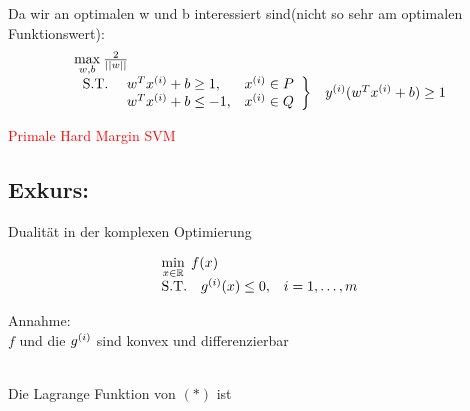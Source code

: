 		Da wir an optimalen w und b interessiert sind(nicht so sehr am optimalen Funktionswert):\\
		
		\begin{equation*}
			\begin{array}{ll}
				\underset{w,b}{\max}\medspace \frac{2}{||w||}\\ \left.
				\begin{array}{lll}
					\text{S.T. } & w^Tx^{(i)} + b \geq  1, & x^{(i)} \in P\\
					& w^Tx^{(i)} + b \leq -1, & x^{(i)} \in Q
				\end{array} \right\} &  y^{(i)}(w^Tx^{(i)} + b) \geq 1
			\end{array}
		\end{equation*}
		
		\begin{center}
			 \textcolor{red}{Primale Hard Margin SVM}
		\end{center}
		
	\subsection*{Exkurs:} Dualität in der komplexen Optimierung\\
		
		\begin{minipage}[]{0.45\linewidth}
			\begin{equation*}
				\begin{array}{lll}
					\multicolumn{2}{l}{\minn{x \in \R} \medspace f(x)} \\
					\text{S.T.} & \vi{g}{i}(x) \leq 0, & i = 1,\dots,m 
				\end{array}
			\end{equation*}
		\end{minipage}
		\hfill
		\begin{minipage}[]{0.45\linewidth}
			Annahme:\\
			$ f $ und die $ g^{(i)}$ sind konvex und differenzierbar
		\end{minipage}\\
				
		Die Lagrange Funktion von $ (\ast) $ ist
		
